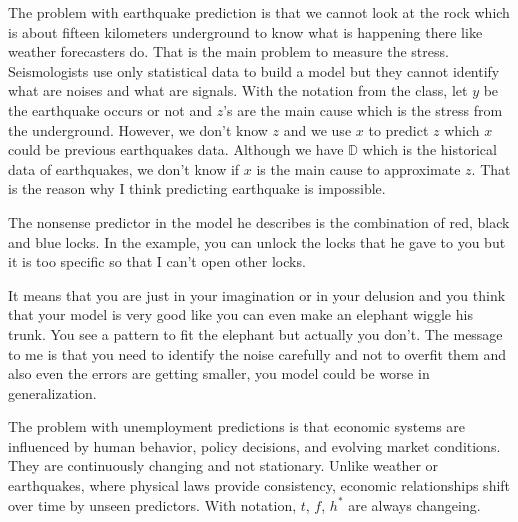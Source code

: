 \documentclass[12pt]{article}
\begin{document}
\begin{enumerate}
The problem with earthquake prediction is that we cannot look at the rock which is about fifteen kilometers underground to know what is happening there like weather forecasters do. That is the main problem to measure the stress. Seismologists use only statistical data to build a model but they cannot identify what are noises and what are signals. With the notation from the class, let $y$ be the earthquake occurs or not and $z$'s are the main cause which is the stress from the underground. However, we don't know $z$ and we use $x$ to predict $z$ which $x$ could be previous earthquakes data. Although we have $\mathbb{D}$ which is the historical data of earthquakes, we don't know if $x$ is the main cause to approximate $z$. That is the reason why I think predicting earthquake is impossible.


The nonsense predictor in the model he describes is the combination of red, black and blue locks. In the example, you can unlock the locks that he gave to you but it is too specific so that I can't open other locks.


It means that you are just in your imagination or in your delusion and you think that your model is very good like you can even make an elephant wiggle his trunk. You see a pattern to fit the elephant but actually you don't. The message to me is that you need to identify the noise carefully and not to overfit them and also even the errors are getting smaller, you model could be worse in generalization.


The problem with unemployment predictions is that economic systems are influenced by human behavior, policy decisions, and evolving market conditions. They are continuously changing and not stationary. Unlike weather or earthquakes, where physical laws provide consistency, economic relationships shift over time by unseen predictors. With notation, $t$, $f$, $h^*$ are always changeing.



\end{enumerate}
\end{document}
